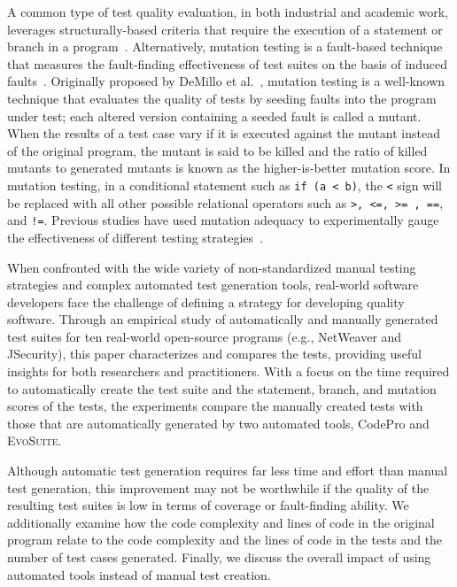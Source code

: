 
A common type of test quality evaluation, in both industrial and academic work, leverages structurally-based criteria that require the execution of a statement or branch in a program~\cite{weyuker1988evaluation}.  Alternatively, mutation testing is a fault-based technique that measures the fault-finding effectiveness of test suites on the basis of induced faults~\cite{demillo1978hints, hamlet1977testing}.  Originally proposed by DeMillo et al.~\cite{demillo1978hints}, mutation testing is a well-known technique that evaluates the quality of tests by seeding faults into the program under test; each altered version containing a seeded fault is called a mutant. When the results of a test case vary if it is executed against the mutant instead of the original program, the mutant is said to be killed and the ratio of killed mutants to generated mutants is known as the higher-is-better mutation score. In mutation testing, in a conditional statement such as \texttt{if (a < b)}, the \texttt{<} sign will be replaced with all other possible relational operators such as \texttt{>, <=, >= , ==}, and \texttt{!=}. Previous studies have used mutation adequacy to experimentally gauge the effectiveness of different testing strategies~\cite{andrews2005mutation,andrews2006,do2006,just2014}.  


When confronted with the wide variety of non-standardized manual testing strategies and complex automated test generation tools, real-world software developers face the challenge of defining a strategy for developing quality software.  Through an empirical study of automatically and manually generated test suites for ten real-world open-source programs (e.g., NetWeaver and JSecurity), this paper characterizes and compares the tests, providing useful insights for both researchers and practitioners. With a focus on the time required to automatically create the test suite and the statement, branch, and mutation scores of the tests, the experiments compare the manually created tests with those that are automatically generated by two automated tools, CodePro and \textsc{EvoSuite}.

Although automatic test generation requires far less time and effort than manual test
generation, this improvement may not be worthwhile if the quality of the resulting test suites is low in terms of
coverage or fault-finding ability.  We additionally examine how the code complexity and lines of code in the original
program relate to the code complexity and the lines of code in the tests and the number of test cases generated.
Finally, we discuss the overall impact of using automated tools instead of manual test creation.

